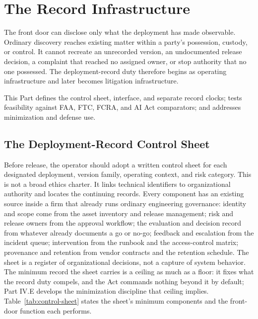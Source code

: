 \section{The Record Infrastructure}
\label{sec:infrastructure}

The front door can disclose only what the deployment has made observable. Ordinary discovery reaches existing matter within a party's possession, custody, or control. It cannot recreate an unrecorded version, an undocumented release decision, a complaint that reached no assigned owner, or stop authority that no one possessed. The deployment-record duty therefore begins as operating infrastructure and later becomes litigation infrastructure.

This Part defines the control sheet, interface, and separate record clocks; tests feasibility against FAA, FTC, FCRA, and AI Act comparators; and addresses minimization and defense use.

\subsection{The Deployment-Record Control Sheet}

Before release, the operator should adopt a written control sheet for each designated deployment, version family, operating context, and risk category. This is not a broad ethics charter. It links technical identifiers to organizational authority and locates the continuing records. Every component has an existing source inside a firm that already runs ordinary engineering governance: identity and scope come from the asset inventory and release management; risk and release owners from the approval workflow; the evaluation and decision record from whatever already documents a go or no-go; feedback and escalation from the incident queue; intervention from the runbook and the access-control matrix; provenance and retention from vendor contracts and the retention schedule. The sheet is a register of organizational decisions, not a capture of system behavior. The minimum record the sheet carries is a ceiling as much as a floor: it fixes what the record duty compels, and the Act commands nothing beyond it by default; Part IV.E develops the minimization discipline that ceiling implies. Table~\ref{tab:control-sheet} states the sheet's minimum components and the front-door function each performs.

